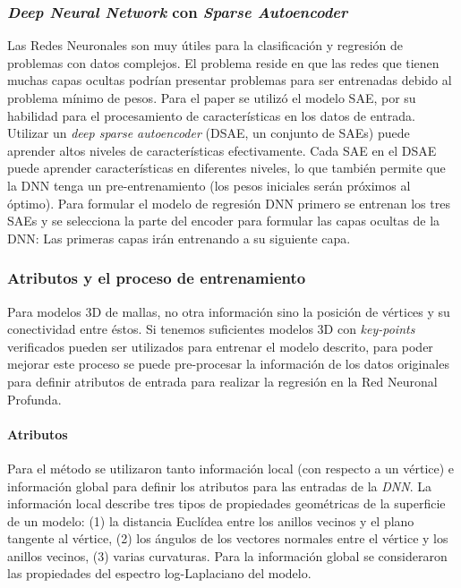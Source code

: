 \documentclass[conference]{IEEEtran}
\begin{document}
\subsubsection{\textit{Deep Neural Network} con \textit{Sparse Autoencoder}}
Las Redes Neuronales son muy útiles para la clasificación y regresión de problemas con datos complejos. El problema reside en que las redes que tienen muchas capas ocultas podrían presentar problemas para ser entrenadas debido al problema mínimo de pesos. 
Para el paper se utilizó el modelo SAE, por su habilidad para el procesamiento de características en los datos de entrada. Utilizar un \textit{deep sparse autoencoder} (DSAE, un conjunto de SAEs) puede aprender altos niveles de características efectivamente. Cada SAE en el DSAE puede aprender características en diferentes niveles, lo que también permite que la DNN tenga un pre-entrenamiento (los pesos iniciales serán próximos al óptimo).
Para formular el modelo de regresión DNN primero se entrenan los tres SAEs y se selecciona la parte del encoder para formular las capas ocultas de la DNN: Las primeras capas irán entrenando a su siguiente capa.

\subsubsection{Atributos y el proceso de entrenamiento}
Para modelos 3D de mallas, no otra información sino la posición de vértices y su conectividad entre éstos. Si tenemos suficientes modelos 3D con \textit{key-points} verificados pueden ser utilizados para entrenar el modelo descrito, para poder mejorar este proceso se puede pre-procesar la información de los datos originales para definir atributos de entrada para realizar la regresión en la Red Neuronal Profunda.

\paragraph{Atributos}
Para el método se utilizaron tanto información local (con respecto a un vértice) e información global para definir los atributos para las entradas de la \textit{DNN}. La información local describe tres tipos de propiedades geométricas de la superficie de un modelo: (1) la distancia Euclídea entre los anillos vecinos y el plano tangente al vértice, (2) los ángulos de los vectores normales entre el vértice y los anillos vecinos, (3) varias curvaturas. Para la información global se consideraron las propiedades del espectro log-Laplaciano del modelo.
\end{document}
